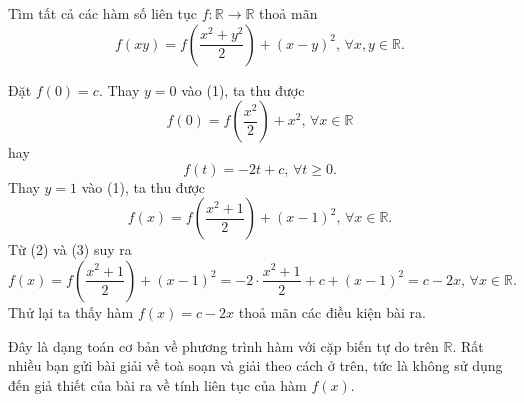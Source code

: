 \begin{bt}%
	Tìm tất cả các hàm số liên tục $f: \mathbb R \to \mathbb R$ thoả mãn
	\begin{equation}
	f(xy)=f\left(\dfrac{x^2+y^2}{2}\right) + (x-y)^2, \, \forall x, y \in \mathbb R. \tag{1}
	\end{equation}
	\loigiai
	{
		Đặt $f(0)=c.$ Thay $y=0$ vào (1), ta thu được
		\begin{equation*}
		f(0)= f\left(\dfrac{x^2}{2}\right) + x^2, \, \forall x \in \mathbb R
		\end{equation*}
		hay \begin{equation*}
		f(t)= -2t +c, \, \forall t\geq 0. \tag{2}
		\end{equation*}
		Thay $y=1$ vào (1), ta thu được
		\begin{equation*}
		f(x)= f\left(\dfrac{x^2+1}{2}\right) + (x-1)^2, \, \forall x \in \mathbb R.\tag{3}
		\end{equation*}
		Từ (2) và (3) suy ra
		\begin{equation*}
		f(x)=f\left(\dfrac{x^2+1}{2}\right) + (x-1)^2= -2\cdot\dfrac{x^2+1}{2} + c + (x-1)^2= c- 2x, \, \forall x \in \mathbb R.
		\end{equation*}
		Thử lại ta thấy hàm $f(x)= c -2x$ thoả mãn các điều kiện bài ra.
		
		\begin{nx}
			Đây là dạng toán cơ bản về phương trình hàm với cặp biến tự do trên $\mathbb R.$ Rất nhiều bạn gửi bài giải về toà soạn và giải theo cách ở trên, tức là không sử dụng đến giả thiết của bài ra về tính liên tục của hàm $f(x).$
		\end{nx}
	}
\end{bt}


